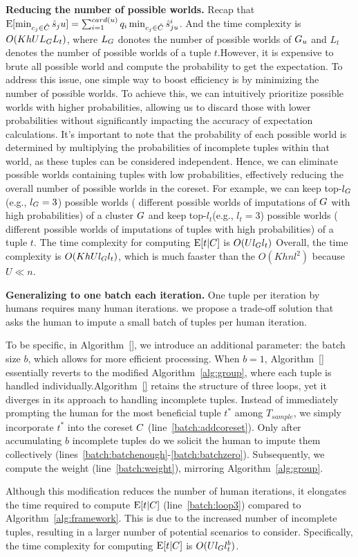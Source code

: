 \noindent \textbf{Reducing the number of possible worlds.} Recap that $\mathrm{E}[\min_{c_j\in \hat {C}}\hat{s}_ju] = \sum_{i=1}^{card(u)} q_i \min_{c_j \in \hat{C}} \hat{s}_{ju}^i$. And the time complexity is $O(KhUL_{G}L_t)$, where $L_{G}$ donotes the number of possible worlds of $G_u$ and $L_t$ denotes the number of possible worlds of a tuple $t$.However, it is expensive to brute all possible world and compute the probability to get the expectation. To address this issue, one simple way to boost efficiency is by minimizing the number of possible worlds. To achieve this, we can intuitively prioritize possible worlds with higher probabilities, allowing us to discard those with lower probabilities without significantly impacting the accuracy of expectation calculations. It's important to note that the probability of each possible world is determined by multiplying the probabilities of incomplete tuples within that world, as these tuples can be considered independent. Hence, we can eliminate possible worlds containing tuples with low probabilities, effectively reducing the overall number of possible worlds in the coreset. For example, we can keep top-$l_G$(e.g., $l_G = 3$) possible worlds ( different possible worlds of imputations of $G$ with high probabilities) of a cluster $G$ and keep top-$l_t$(e.g., $l_t = 3$) possible worlds ( different possible worlds of imputations of tuples with high probabilities) of a tuple $t$. The time complexity for computing $\mathrm{E}[t|C]$ is $O(Ul_{G}l_t)$ Overall, the time complexity is $O(KhUl_{G}l_t)$, which is much faaster than the $O(Khnl^2)$ because $U \ll n$.

\noindent \textbf{Generalizing to one batch each iteration.}
One tuple per iteration by humans  requires many human iterations.  we propose a trade-off solution that asks the human to impute a small batch of tuples per human iteration.


To be specific, in Algorithm~\ref{}, we introduce an additional parameter: the batch size $b$, which allows for more efficient processing. When $b=1$, Algorithm~\ref{} essentially reverts to the modified Algorithm~\ref{alg:group}, where each tuple is handled individually.Algorithm~\ref{} retains the structure of three loops, yet it diverges in its approach to handling incomplete tuples. Instead of immediately prompting the human for the most beneficial tuple $t^*$ among $T_{sample}$, we simply incorporate $t^*$ into the coreset $C$ (line~\ref{batch:addcoreset}). Only after accumulating $b$ incomplete tuples do we solicit the human to impute them collectively (lines~\ref{batch:batchenough}-\ref{batch:batchzero}). Subsequently, we compute the weight (line~\ref{batch:weight}), mirroring Algorithm~\ref{alg:group}.

Although this modification reduces the number of human iterations, it elongates the time required to compute $\mathrm{E}[t|C]$ (line~\ref{batch:loop3}) compared to Algorithm~\ref{alg:framework}. This is due to the increased number of incomplete tuples, resulting in a larger number of potential scenarios to consider. Specifically, the time complexity for computing $\mathrm{E}[t|C]$ is $O(Ul_{G}l_t^b)$.